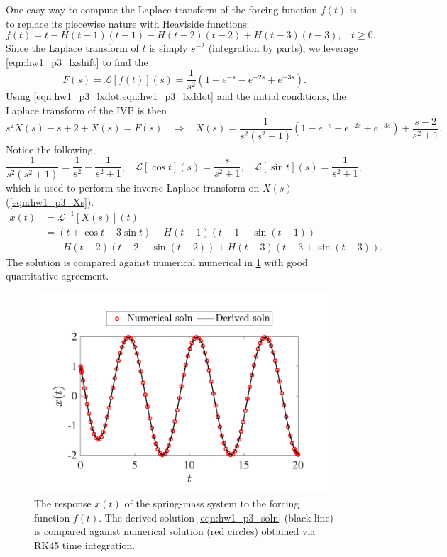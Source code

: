 One easy way to compute the Laplace transform of the forcing function $f(t)$ is to replace its piecewise nature with Heaviside functions:
\begin{equation}
    f(t) = t - H(t-1)(t-1) - H(t-2)(t-2) + H(t-3)(t-3), ~~~~ t\geq 0.
\end{equation}
Since the Laplace transform of $t$ is simply $s^{-2}$ (integration by parts), we leverage \cref{eqn:hw1_p3_lxshift} to find the 
\begin{equation}
    F(s) = \mathcal{L}[f(t)](s) = \frac{1}{s^2} \left(1 - e^{-s} - e^{-2s} + e^{-3s}\right).
\end{equation}
Using \cref{eqn:hw1_p3_lxdot,eqn:hw1_p3_lxddot} and the initial conditions, the Laplace transform of the IVP is then 
\begin{equation}\label{eqn:hw1_p3_Xs}
    s^2 X(s) - s + 2 + X(s) = F(s) ~~~~ \Rightarrow ~~~~ X(s) = \frac{1}{s^2(s^2+1)} \left(1 - e^{-s} - e^{-2s} + e^{-3s}\right) + \frac{s-2}{s^2+1}.
\end{equation}
Notice the following,
\begin{equation}
    \frac{1}{s^2(s^2+1)} = \frac{1}{s^2} - \frac{1}{s^2+1}, ~~~~ \mathcal{L}[\cos t](s) = \frac{s}{s^2+1}, ~~~~ \mathcal{L}[\sin t](s) = \frac{1}{s^2+1},
\end{equation}
which is used to perform the inverse Laplace transform on $X(s)$ (\cref{eqn:hw1_p3_Xs}). 
\begin{equation}\label{eqn:hw1_p3_soln}
\begin{aligned}
    x(t) &= \mathcal{L}^{-1}[X(s)](t) \\
    &= (t + \cos t - 3\sin t) - H(t-1) (t - 1 - \sin(t - 1)) \\
    &~~~- H(t-2)(t - 2 - \sin(t-2)) + H(t-3)(t - 3 + \sin(t-3)).
\end{aligned}
\end{equation}
The solution is compared against numerical numerical in \cref{fig:hw1_p3_soln} with good quantitative agreement.

\begin{figure}
    \centering
    \includegraphics[width=0.5\linewidth]{homework/hw1/assets/hw1_p3_soln.pdf}
    \caption{The response $x(t)$ of the spring-mass system to the forcing function $f(t)$. The derived solution \cref{eqn:hw1_p3_soln} (black line) is compared against numerical solution (red circles) obtained via RK45 time integration.} 
    \label{fig:hw1_p3_soln}
\end{figure}

